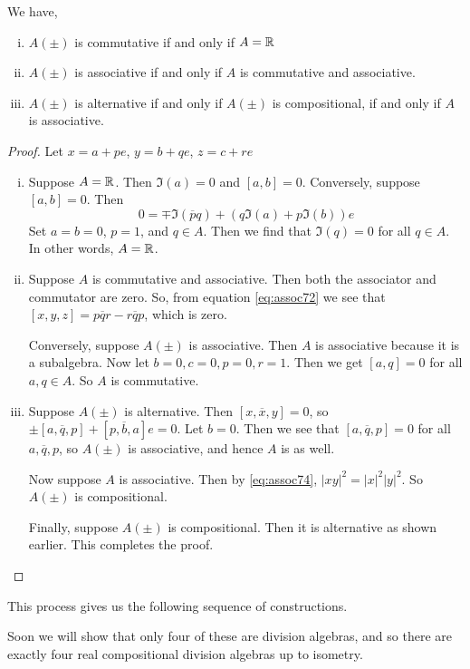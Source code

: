 \begin{thm}\label{thm:18.1}
We have,
\begin{enumerate}[(i)]
\item {
$A(\pm)$ is commutative if and only if $A=\operatorname{\mathbb{R}}$
}\item {
$A(\pm)$ is associative if and only if $A$ is commutative and associative.
}
\item {
$A(\pm)$ is alternative if and only if $A(\pm)$ is compositional, if and only if $A$ is associative.
}
\end{enumerate}
\end{thm}
\begin{proof}
Let $x = a+pe$, $y= b+qe$, $z = c+re$ 
\begin{enumerate}[(i)]
\item {
Suppose $A=\operatorname{\mathbb{R}}$. Then $\Im(a)=0$ and $[a,b]=0$. Conversely, suppose $[a,b]=0$. Then \[0=\mp \Im(\overline{p}q)+(q\Im(a)+p\Im(b))e\]
Set $a=b=0$, $p=1$, and $q\in A$. Then we find that $\Im(q)=0$ for all $q\in A$. In other words, $A=\operatorname{\mathbb{R}}$.
}
\item {
Suppose $A$ is commutative and associative. Then both the associator and commutator are zero. So, from equation \ref{eq:assoc72} we see that $[x,y,z] = p\overline{q}r-r\overline{q}p$, which is zero.

Conversely, suppose $A(\pm)$ is associative. Then $A$ is associative because it is a subalgebra. Now let $b=0,c=0,p=0,r=1$. Then we get $[a,q]=0$ for all $a,q\in A$. So $A$ is commutative.
}
\item {
Suppose $A(\pm)$ is alternative. Then $[x,\overline{x},y]=0$, so $\pm[a,\overline{q},p]+[p,\overline{b},a]e=0$. Let $b=0$. Then we see that $[a,\overline{q},p]=0$ for all $a,\overline{q},p$, so $A(\pm)$ is associative, and hence $A$ is as well.

Now suppose $A$ is associative. Then by \ref{eq:assoc74}, $|xy|^2 = |x|^2|y|^2$. So $A(\pm)$ is compositional.

Finally, suppose $A(\pm)$ is compositional. Then it is alternative as shown earlier. This completes the proof.
}
\end{enumerate}
\end{proof}
This process gives us the following sequence of constructions.

\begin{center}
\end{center} 
Soon we will show that only four of these are division algebras, and so there are exactly four real compositional division algebras up to isometry. 

